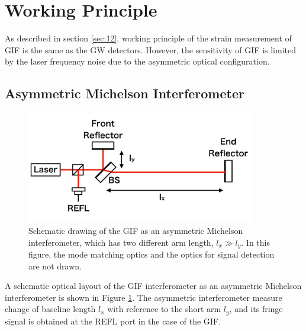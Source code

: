 \section{Working Principle} \label{sec:sec42}
As described in section \cref{sec:12}, working principle of the strain measurement of GIF is the same as the GW detectors. However, the sensitivity of GIF is limited by the laser frequency noise due to the asymmetric optical configuration.
\subsection{Asymmetric Michelson Interferometer}
\begin{figure}[h]
  \centering
  \includegraphics[width=10.0cm]{./img_chap4/img401.png}
  \caption{Schematic drawing of the GIF as an asymmetric Michelson interferometer, which has two different arm length, $l_x\gg{l_y}$. In this figure, the mode matching optics and the optics for signal detection are not drawn.} \label{img:img401}
\end{figure}
A schematic optical layout of the GIF interferometer as an asymmetric Michelson interferometer is shown in Figure  \ref{img:img401}. The asymmetric interferometer measure change of baseline length $l_x$ with reference to the short arm $l_y$, and its fringe signal is obtained at the REFL port in the case of the GIF.

